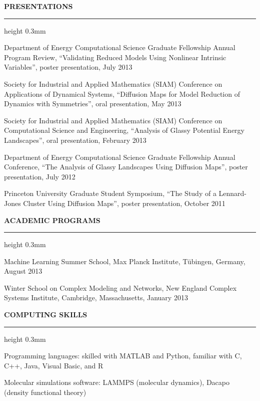 \documentclass[letterpaper,10pt]{article}
\newenvironment{itemize*}
  {\begin{itemize}
    \setlength{\parskip}{-2pt}}
  {\end{itemize}}
\newcommand{\cvheading}[1]{
\vspace{0.15in}
\noindent
\MakeUppercase{\bf #1}
\vspace{0.08in}
{\hrule height 0.3mm}
\vspace{0.08in}}
\begin{document}
\cvheading{Presentations}
\begin{itemize*}
\item Department of Energy Computational Science Graduate Fellowship Annual Program Review, ``Validating Reduced Models Using Nonlinear Intrinsic Variables'', poster presentation, July 2013
\item Society for Industrial and Applied Mathematics (SIAM) Conference on Applications of Dynamical Systems, ``Diffusion Maps for Model Reduction of Dynamics with Symmetries'', oral presentation, May 2013
\item Society for Industrial and Applied Mathematics (SIAM) Conference on Computational Science and Engineering, ``Analysis of Glassy Potential Energy Landscapes'', oral presentation, February 2013
\item Department of Energy Computational Science Graduate Fellowship Annual Conference, ``The Analysis of Glassy Landscapes Using Diffusion Maps'', poster presentation, July 2012
\item Princeton University Graduate Student Symposium, ``The Study of a Lennard-Jones Cluster Using Diffusion Maps'', poster presentation, October 2011
\end{itemize*}

\cvheading{Academic Programs}
\begin{itemize*}
\item Machine Learning Summer School, Max Planck Institute, T\"{u}bingen, Germany, August 2013
\item Winter School on Complex Modeling and Networks, New England Complex Systems Institute, Cambridge, Massachusetts, January 2013
\end{itemize*}

\cvheading{Computing Skills}
\begin{itemize*}
\item Programming languages: skilled with MATLAB and Python, familiar with C, C++, Java, Visual Basic, and R
\item Molecular simulations software: LAMMPS (molecular dynamics), Dacapo (density functional theory)
\end{itemize*}
\end{document}
